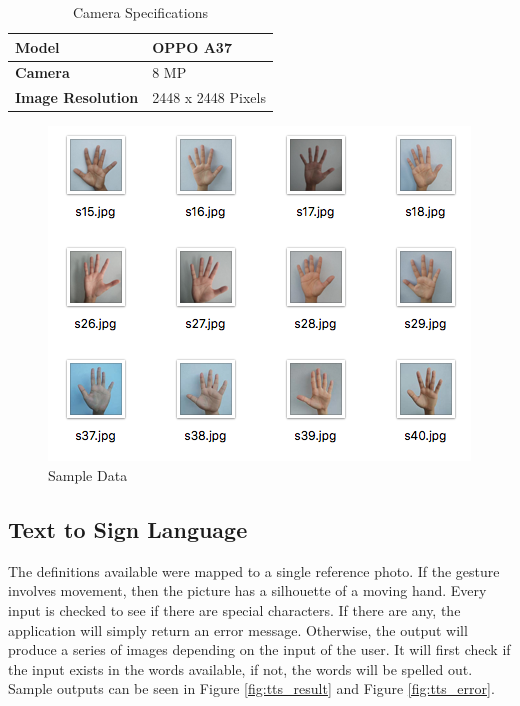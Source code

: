 \documentclass[journal]{./IEEE/IEEEtran}
\begin{document}
\begin{table}[ht!]
\centering
\caption{Camera Specifications}
\begin{tabular}{|l|l|}
\hline
\textbf{Model}            & OPPO A37           \\ \hline
\textbf{Camera}           & 8 MP               \\ \hline
\textbf{Image Resolution} & 2448 x 2448 Pixels \\ \hline
\end{tabular}
\end{table}

\begin{figure}[ht!]
    \centering
    \includegraphics[width=1\linewidth]{./images/data.png}
    \caption{Sample Data}
    \label{fig:data}
\end{figure}

\subsection{Text to Sign Language}
The definitions available were mapped to a single reference photo. If the gesture involves movement, then the picture has a silhouette of a moving hand.
\newline
\indent Every input is checked to see if there are special characters. If there are any, the application will simply return an error message. Otherwise, the output will produce a series of images depending on the input of the user. It will first check if the input exists in the words available, if not, the words will be spelled out. Sample outputs can be seen in Figure \ref{fig:tts_result} and Figure \ref{fig:tts_error}.
\end{document}

